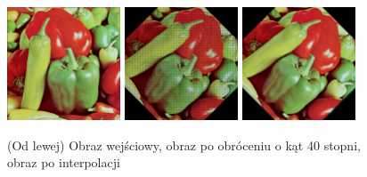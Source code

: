 \documentclass[final,a4paper,openany,12pt]{mwbk}
\begin{document}
\begin{figure}[H]
	\begin{center}
		\includegraphics[width=0.3\textwidth]{1/1Geo_Turn_Original}
		\includegraphics[width=0.3\textwidth]{1/1Geo_Turn_Result}
		\includegraphics[width=0.3\textwidth]{1/1Geo_Turn_Result_Interp}
	\end{center}
	\caption{(Od lewej) Obraz wejściowy, obraz po obróceniu o kąt 40 stopni, obraz po interpolacji }
\end{figure}
\end{document}
